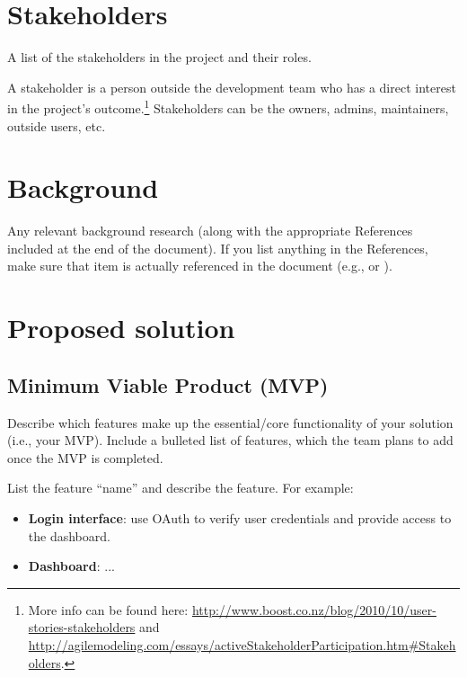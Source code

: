 \documentclass{article}
\begin{document}
\section{Stakeholders}
A list of the stakeholders in the project and their roles.

A stakeholder is a person outside the development team who has a direct interest in the project's outcome.\footnote{More info can be found here: \url{http://www.boost.co.nz/blog/2010/10/user-stories-stakeholders} and \url{http://agilemodeling.com/essays/activeStakeholderParticipation.htm#Stakeholders}.}
Stakeholders can be the owners, admins, maintainers, outside users, etc.

\section{Background}
Any relevant background research (along with the appropriate References included at the end of the document).
If you list anything in the References, make sure that item is actually referenced in the document (e.g., \cite{adams1995hitchhiker} or \citep{adams1995hitchhiker}).

\section{Proposed solution}
\subsection{Minimum Viable Product (MVP)}
Describe which features make up the essential/core functionality of your solution (i.e., your MVP).
Include a bulleted list of features, which the team plans to add once the MVP is completed.

List the feature ``name'' and describe the feature. For example:
\begin{itemize}
\item \textbf{Login interface}: use OAuth to verify user credentials and provide access to the dashboard.
\item \textbf{Dashboard}: ...
\end{itemize}
\end{document}

